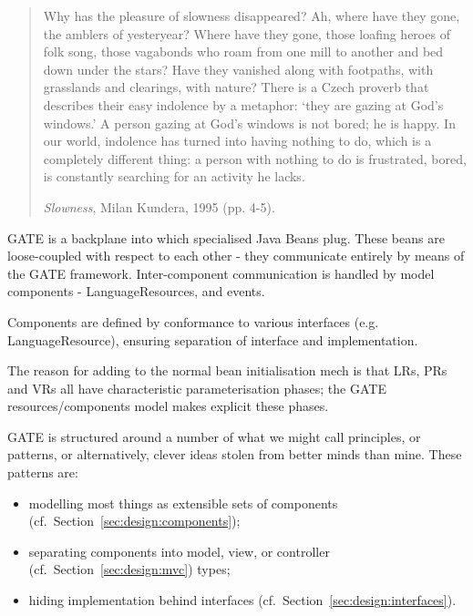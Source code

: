 %
%
%
%



\begin{quote}
Why has the pleasure of slowness disappeared? Ah, where have they gone,
the amblers of yesteryear? Where have they gone, those
loafing heroes of folk song, those vagabonds who roam from one mill to
another and bed down under the stars? Have they vanished
along with footpaths, with grasslands and clearings, with nature? There
is a Czech proverb that describes their easy indolence by a
metaphor: `they are gazing at God's windows.' A person gazing at God's
windows is not bored; he is happy. In our world, indolence
has turned into having nothing to do, which is a completely different
thing: a person with nothing to do is frustrated, bored, is
constantly searching for an activity he lacks. 

{\it Slowness}, Milan Kundera, 1995  (pp. 4-5).
\end{quote}


GATE is a backplane into which specialised Java Beans plug.
These beans are loose-coupled with respect to each other - they communicate
entirely by means of the GATE framework.
Inter-component communication is handled by model components -
LanguageResources, and events.

Components are defined by conformance to various interfaces (e.g.
LanguageResource), ensuring
separation of interface and implementation.

The reason for adding to the normal bean initialisation mech is that
LRs, PRs and VRs all have characteristic parameterisation
phases; the GATE resources/components model makes explicit these phases.



GATE is structured around a number of what we might call principles, or
patterns, or alternatively, clever ideas stolen from better minds than
mine. These patterns are:
\begin{itemize}
\item 
modelling most things as extensible sets of components (cf.\ Section~\ref{sec:design:components});
\item 
separating components into
model, view, or controller (cf.\ Section~\ref{sec:design:mvc}) types;
\item 
hiding implementation behind interfaces (cf.\ Section~\ref{sec:design:interfaces}).
\end{itemize}

